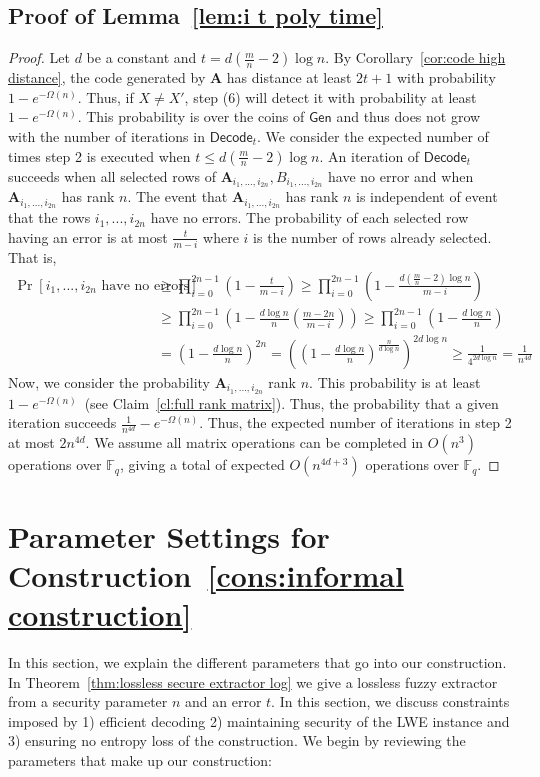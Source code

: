 \documentclass[11pt]{article}
\newcommand{\thref}[1]{\mbox{Theorem~\ref{#1}}}
\newcommand{\corref}[1]{\mbox{Corollary~\ref{#1}}}
\newcommand{\lemref}[1]{\mbox{Lemma~\ref{#1}}}
\newcommand{\clref}[1]{\mbox{Claim~\ref{#1}}}
\newcommand{\consref}[1]{\mbox{Construction~\ref{#1}}}
\newcommand{\class}[1]{{\ensuremath{\mathsf{#1}}}}
\newcommand{\gen}{\ensuremath{\class{Gen}}\xspace}
\newcommand{\vect}[1]{\ensuremath{\textbf{#1}}}
\newcommand{\Fq}{\ensuremath{\mathbb{F}_q}}
\newcommand{\decode}{\ensuremath{\mathsf{Decode}}}
\newcommand{\vA}{\vect{A}}
\begin{document}
\subsection{Proof of \lemref{lem:i t poly time}}
\label{sec:proof lem i t poly time}
\begin{proof}
Let $d$ be a constant and $t = d\left( \frac{m}{n}-2\right)\log n$.  
By \corref{cor:code high distance}, the code generated by $\vA$ has distance at least $2t+1$ with probability $1-e^{-\Omega(n)}$.  Thus, if $X\neq X'$, step (6) will detect it with probability at least $1-e^{-\Omega(n)}$.  This probability is over the coins of $\gen$ and thus does not grow with the number of iterations in $\decode_t$.  We consider the expected number of times step 2 is executed when $t\leq d\left(\frac{m}{n}-2\right)\log n$. 
An iteration of $\decode_t$ succeeds when all selected rows of $\vA_{i_1,..., i_{2n}}, B_{i_1,..., i_{2n}}$ have no error and when  $\vA_{i_1,..., i_{2n}}$ has rank $n$.  The event that $\vA_{i_1,..., i_{2n}}$ has rank $n$ is independent of event that the rows $i_1,...,i_{2n}$ have no errors.  The probability of each selected row having an error is at most $\frac{t}{m - i}$ where $i$ is the number of rows already selected.  That is,
\begin{align*}
\Pr[i_1,..., i_{2n}\text{ have no errors}]&\geq \prod_{i=0}^{2n-1}\left(1 - \frac{t}{m-i}\right)\geq \prod_{i=0}^{2n-1}\left( 1-\frac{d\left(\frac{m}{n}-2\right)\log n}{m-i}\right)\\
&\geq  \prod_{i=0}^{2n-1}\left( 1-\frac{d\log n}{n}\left(\frac{m-2n}{m-i}\right)\right)\geq \prod_{i=0}^{2n-1}\left( 1-\frac{d\log n}{n}\right) \\
&= \left(1-\frac{d\log n}{n}\right)^{2n}  = \left(\left(1-\frac{d\log n}{n}\right)^{\frac{n}{d\log n}}\right)^{2d\log n}\geq \frac{1}{4^{2d\log n}} = \frac{1}{n^{4d}}
\end{align*}
Now, we consider the probability  $\vA_{i_1,..., i_{2n}}$  rank $n$.  This probability is at least $1-e^{-\Omega(n)}$~(see \clref{cl:full rank matrix}).  Thus, the probability that a given iteration succeeds $\frac{1}{n^{4d}} - e^{-\Omega(n)}$.  
Thus, the expected number of iterations in step 2 at most  $2n^{4d}$.  We assume all matrix operations can be completed in  $O(n^3)$ operations over $\Fq$, giving a total of expected $O(n^{4d+3})$ operations over $\Fq$.  
\end{proof}

\section{Parameter Settings for \consref{cons:informal construction}}
\label{sec:parameter settings}
In this section, we explain the different parameters that go into our construction.  In \thref{thm:lossless secure extractor log} we give a lossless fuzzy extractor from a security parameter $n$ and an error $t$.  In this section, we discuss constraints imposed by 1) efficient decoding 2) maintaining security of the LWE instance and 3) ensuring no entropy loss of the construction.  We begin by reviewing the parameters that make up our construction:
\end{document}
